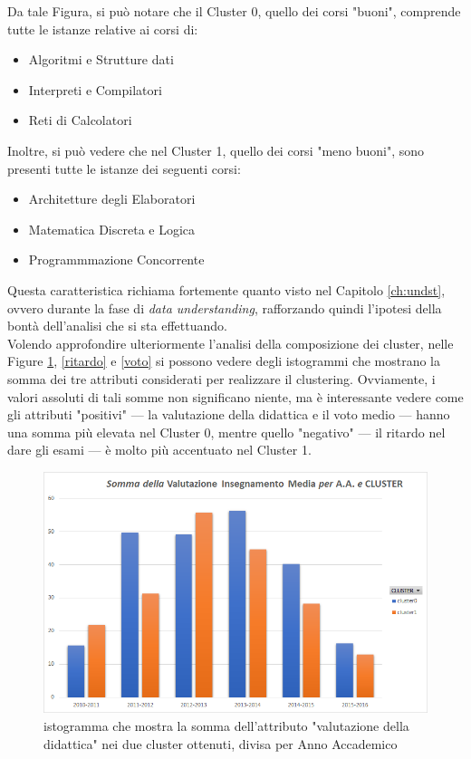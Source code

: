         Da tale Figura, si può notare che il Cluster $0$, quello dei corsi "buoni", comprende tutte le istanze relative ai corsi di:

        \begin{itemize}
            \item Algoritmi e Strutture dati
            \item Interpreti e Compilatori
            \item Reti di Calcolatori
        \end{itemize}

        Inoltre, si può vedere che nel Cluster 1, quello dei corsi "meno buoni", sono presenti tutte le istanze dei seguenti corsi:

        \begin{itemize}
            \item Architetture degli Elaboratori
            \item Matematica Discreta e Logica
            \item Programmmazione Concorrente
        \end{itemize}

        Questa caratteristica richiama fortemente quanto visto nel Capitolo \ref{ch:undst}, ovvero durante la fase di \textit{data understanding}, rafforzando quindi l'ipotesi della bontà dell'analisi che si sta effettuando. \\

        Volendo approfondire ulteriormente l'analisi della composizione dei cluster, nelle Figure \ref{eval}, \ref{ritardo} e \ref{voto} si possono vedere degli istogrammi che mostrano la somma dei tre attributi considerati per realizzare il clustering. Ovviamente, i valori assoluti di tali somme non significano niente, ma è interessante vedere come gli attributi "positivi" --- la valutazione della didattica e il voto medio --- hanno una somma più elevata nel Cluster $0$, mentre quello "negativo" --- il ritardo nel dare gli esami --- è molto più accentuato nel Cluster 1.

        \begin{figure}
            \centering
            \caption{istogramma che mostra la somma dell'attributo "valutazione della didattica" nei due cluster ottenuti, divisa per Anno Accademico}
            \label{eval}
            \includegraphics[scale=0.5]{../cluster/min_kmeans_2cl_eval.png}
        \end{figure}

